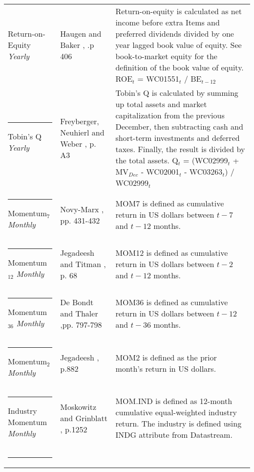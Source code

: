 \documentclass[12pt]{article}
\begin{document}
\begin{appendices}
{{\begin{xltabular}{\textwidth}{ >{\raggedright\arraybackslash}p{0.23\textwidth} >{\raggedright\arraybackslash}p{0.2\textwidth} X}
Return-on-Equity \newline \emph{Yearly}		& Haugen and Baker \citeyearpar{HAUGEN1996}, .p 406		& Return-on-equity is calculated as net income before extra Items and preferred dividends divided by one year lagged book value of equity. See book-to-market equity for the definition of the book value of equity. \newline ROE$_t$ = WC01551$_{t}$ / BE$_{t-12}$ \\ \rule{-1ex}{3ex}
Tobin's Q 	\newline \emph{Yearly}			& Freyberger, Neuhierl and Weber \citeyearpar{Freyberger2020}, p. A3 & Tobin's Q is calculated by summing up total assets and market capitalization from the previous December, then subtracting cash and short-term investments and deferred taxes. Finally, the result is divided by the total assets. \newline Q$_t$ = (WC02999$_{t}$ + MV$_{Dec}$ - WC02001$_{t}$ - WC03263$_{t}$) / WC02999$_{t}$ \\ \rule{-1ex}{3ex}
Momentum$_{7}$ \newline \emph{Monthly}	& Novy-Marx \citeyearpar{NOVYMARX2012}, pp. 431-432	& MOM7 is defined as cumulative return in US dollars between $t-7$ and $t-12$ months.\\ \rule{-1ex}{3ex}
Momentum$_{12}$ \newline \emph{Monthly}	& Jegadeesh and Titman \citeyearpar{Jegadeesh1993}, p. 68	& MOM12 is defined as cumulative return in US dollars between $t-2$ and $t-12$ months.\\ \rule{-1ex}{3ex}
Momentum$_{36}$ \newline \emph{Monthly}	& De Bondt and Thaler \citeyearpar{DeBondt1985},\newline pp. 797-798& MOM36 is defined as cumulative return in US dollars between $t-12$ and $t-36$ months.\\ \rule{-1ex}{3ex}
Momentum$_{2}$ \newline \emph{Monthly}	& Jegadeesh \citeyearpar{Jegadeesh1990}, p.882			& MOM2 is defined as the prior month's return in US dollars.\\ \rule{-1ex}{3ex}
Industry Momentum \newline \emph{Monthly} 	& Moskowitz and Grinblatt \citeyearpar{Moskowitz1999}, p.1252& MOM.IND is defined as 12-month cumulative equal-weighted industry return. The industry is defined using INDG attribute from Datastream.\footnotemark {} \\ \rule{-1ex}{3ex}

\end{xltabular}}}
\end{appendices}
\end{document}
